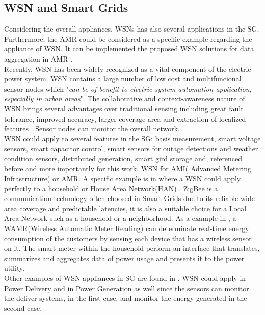 \subsection{WSN and Smart Grids}
Considering the overall appliances, WSNs has also several applications in the SG. Furthermore, the AMR could be considered as a specific example regarding the appliance of WSN. It can be implemented the proposed WSN solutions for data aggregation in AMR .\\
Recently, WSN has been widely  recognized as a vital component of the electric power system\cite{journals/ijdsn/Liu12}. WSN contains a large number of low cost and multifuncional sensor nodes which "\textit{can be of benefit to electric system automation application, especially in urban areas}"\cite{RePEc:eee:rensus:v:15:y:2011:i:6:p:2736-2742}. The collaborative and context-awareness nature of WSN brings several advantages over traditional sensing including great fault tolerance, improved accuracy, larger coverage area and extraction of localized features \cite{journals/ijdsn/Liu12}. Sensor nodes can monitor the overall network.\\
WSN could apply to several features in the SG: basis measurement, smart voltage sensors, smart capacitor control, smart sensors for outage detections and weather condition sensors, distributed generation, smart gird storage and, referenced before and more importantly for this work, WSN for AMI( Advanced Metering Infrastructure) or AMR.
A specific example is in \cite{journals/ijdsn/Liu12} where a WSN could apply perfectly to a household or House Area Network(HAN) . ZigBee  is a communication technology often choosed in Smart Grids  due to its reliable wide area coverage and predictable latencies, it is also a suitable choice for a Local Area Network such as a household or a neighborhood. As a example in \cite{journals/ijdsn/Liu12}, a WAMR(Wireless Automatic Meter Reading) can determinate real-time energy consumption of the customers by sensing each device that has a wireless sensor on it. The smart meter within the household perform an interface that translates, summarizes and aggregates data of power usage and presents it to the power utility.\\ 
Other examples of WSN appliances in SG are found in \cite{journals/ijdsn/Liu12}. WSN could apply in Power Delivery and in Power Generation as well since the sensors can monitor the deliver systems, in the first case, and monitor the energy generated in the second case.\\
